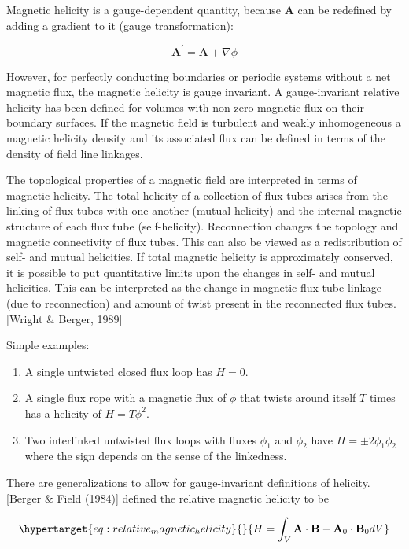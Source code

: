 \documentclass[
  notoc %
]{tufte-book}
\providecommand{\tightlist}{%
  \setlength{\itemsep}{0pt}\setlength{\parskip}{0pt}
}
\begin{document}
Magnetic helicity is a gauge-dependent quantity, because \(\mathbf{A}\)
can be redefined by adding a gradient to it (gauge transformation):

\[
\mathbf{A}^\prime = \mathbf{A} + \nabla\phi
\]

However, for perfectly conducting boundaries or periodic systems without
a net magnetic flux, the magnetic helicity is gauge invariant. A
gauge-invariant relative helicity has been defined for volumes with
non-zero magnetic flux on their boundary surfaces. If the magnetic field
is turbulent and weakly inhomogeneous a magnetic helicity density and
its associated flux can be defined in terms of the density of field line
linkages.

The topological properties of a magnetic field are interpreted in terms
of magnetic helicity. The total helicity of a collection of flux tubes
arises from the linking of flux tubes with one another (mutual helicity)
and the internal magnetic structure of each flux tube (self-helicity).
Reconnection changes the topology and magnetic connectivity of flux
tubes. This can also be viewed as a redistribution of self- and mutual
helicities. If total magnetic helicity is approximately conserved, it is
possible to put quantitative limits upon the changes in self- and mutual
helicities. This can be interpreted as the change in magnetic flux tube
linkage (due to reconnection) and amount of twist present in the
reconnected flux tubes. {[}Wright \& Berger, 1989{]}

Simple examples:

\begin{enumerate}
\def\labelenumi{\arabic{enumi}.}
\tightlist
\item
  A single untwisted closed flux loop has \(H=0\).
\item
  A single flux rope with a magnetic flux of \(\phi\) that twists around
  itself \(T\) times has a helicity of \(H = T\phi^2\).
\item
  Two interlinked untwisted flux loops with fluxes \(\phi_1\) and
  \(\phi_2\) have \(H=\pm2\phi_1\phi_2\) where the sign depends on the
  sense of the linkedness.
\end{enumerate}

There are generalizations to allow for gauge-invariant definitions of
helicity. {[}Berger \& Field (1984){]} defined the relative magnetic
helicity to be

\begin{equation}\protect\hypertarget{eq:relative_magnetic_helicity}{}{
H = \int_V \mathbf{A}\cdot\mathbf{B} - \mathbf{A}_0\cdot\mathbf{B}_0 dV
}\label{eq:relative_magnetic_helicity}\end{equation}
\end{document}
